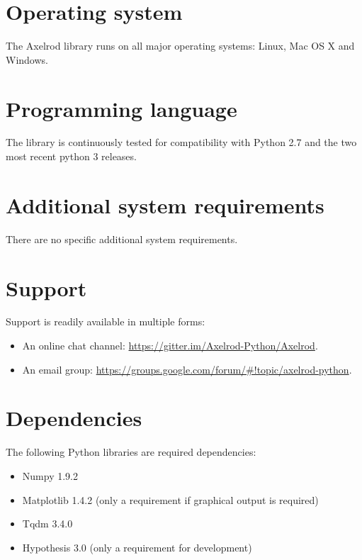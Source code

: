 \documentclass{jors}
\begin{document}
\section*{Operating system}

The Axelrod library runs on all major operating systems: Linux, Mac OS X and
Windows.

\section*{Programming language}

The library is continuously tested for compatibility with Python 2.7 and the two
most recent python 3 releases.

\section*{Additional system requirements}

There are no specific additional system requirements.

\section*{Support}

Support is readily available in multiple forms:

\begin{itemize}[noitemsep,topsep=0pt]
    \item An online chat channel:
        \url{https://gitter.im/Axelrod-Python/Axelrod}.
    \item An  email group:
        \url{https://groups.google.com/forum/#!topic/axelrod-python}.
\end{itemize}

\section*{Dependencies}

The following Python libraries are required dependencies:

\begin{multicols}{2}
    \begin{itemize}[noitemsep,topsep=0pt]
        \item Numpy 1.9.2
        \item Matplotlib 1.4.2 (only a requirement if graphical output is
            required)
        \item Tqdm 3.4.0
        \item Hypothesis 3.0 (only a requirement for development)
    \end{itemize}
\end{multicols}
\end{document}
